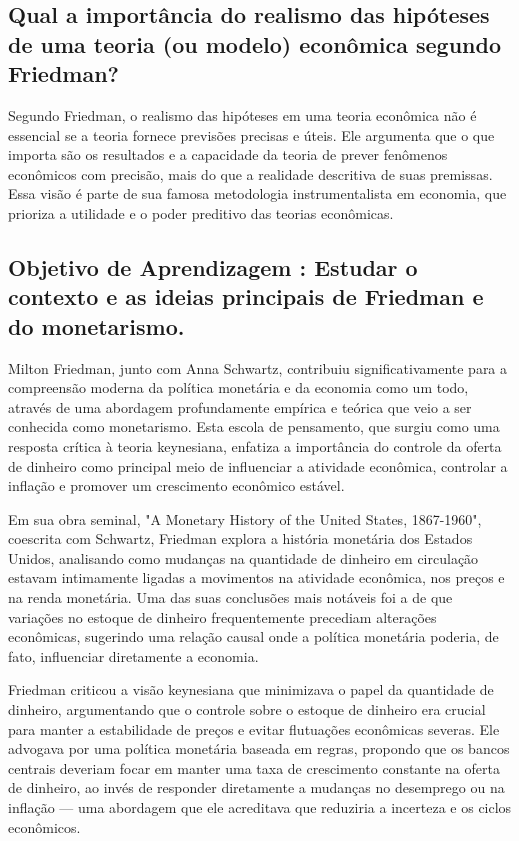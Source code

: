 \documentclass[a4paper,12pt]{article}[abntex2]
\begin{document}
\subsection{\textbf{Qual a importância do realismo das hipóteses de uma teoria (ou modelo) econômica segundo Friedman?}}
Segundo Friedman, o realismo das hipóteses em uma teoria econômica não é essencial se a teoria fornece previsões precisas e úteis. Ele argumenta que o que importa são os resultados e a capacidade da teoria de prever fenômenos econômicos com precisão, mais do que a realidade descritiva de suas premissas. Essa visão é parte de sua famosa metodologia instrumentalista em economia, que prioriza a utilidade e o poder preditivo das teorias econômicas.

\subsection{\textbf{Objetivo de Aprendizagem : Estudar o contexto e as ideias principais de Friedman e do monetarismo.}}
Milton Friedman, junto com Anna Schwartz, contribuiu significativamente para a compreensão moderna da política monetária e da economia como um todo, através de uma abordagem profundamente empírica e teórica que veio a ser conhecida como monetarismo. Esta escola de pensamento, que surgiu como uma resposta crítica à teoria keynesiana, enfatiza a importância do controle da oferta de dinheiro como principal meio de influenciar a atividade econômica, controlar a inflação e promover um crescimento econômico estável.

Em sua obra seminal, "A Monetary History of the United States, 1867-1960", coescrita com Schwartz, Friedman explora a história monetária dos Estados Unidos, analisando como mudanças na quantidade de dinheiro em circulação estavam intimamente ligadas a movimentos na atividade econômica, nos preços e na renda monetária. Uma das suas conclusões mais notáveis foi a de que variações no estoque de dinheiro frequentemente precediam alterações econômicas, sugerindo uma relação causal onde a política monetária poderia, de fato, influenciar diretamente a economia.

Friedman criticou a visão keynesiana que minimizava o papel da quantidade de dinheiro, argumentando que o controle sobre o estoque de dinheiro era crucial para manter a estabilidade de preços e evitar flutuações econômicas severas. Ele advogava por uma política monetária baseada em regras, propondo que os bancos centrais deveriam focar em manter uma taxa de crescimento constante na oferta de dinheiro, ao invés de responder diretamente a mudanças no desemprego ou na inflação — uma abordagem que ele acreditava que reduziria a incerteza e os ciclos econômicos.
\end{document}
